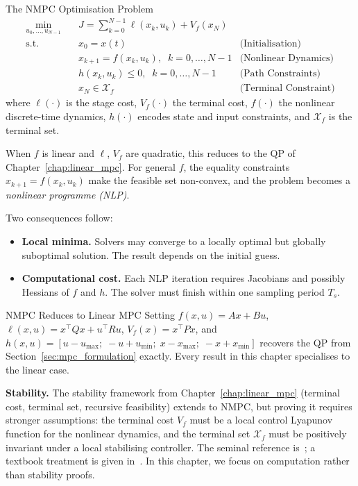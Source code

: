 \begin{defnbox}{The NMPC Optimisation Problem}
	\begin{align*}
		\min_{u_0, \dots, u_{N-1}} \quad & J = \sum_{k=0}^{N-1} \ell(x_k, u_k) + V_f(x_N) \\[4pt]
		\text{s.t.} \quad
		& x_0 = x(t) & \text{(Initialisation)} \\
		& x_{k+1} = f(x_k, u_k), \;\; k = 0, \dots, N{-}1 & \text{(Nonlinear Dynamics)} \\
		& h(x_k, u_k) \le 0, \;\; k = 0, \dots, N{-}1 & \text{(Path Constraints)} \\
		& x_N \in \mathcal{X}_f & \text{(Terminal Constraint)}
	\end{align*}
	where $\ell(\cdot)$ is the stage cost, $V_f(\cdot)$ the terminal cost, $f(\cdot)$ the nonlinear discrete-time dynamics, $h(\cdot)$ encodes state and input constraints, and $\mathcal{X}_f$ is the terminal set.
\end{defnbox}

When $f$ is linear and $\ell$, $V_f$ are quadratic, this reduces to the QP of Chapter~\ref{chap:linear_mpc}. For general $f$, the equality constraints $x_{k+1} = f(x_k, u_k)$ make the feasible set non-convex, and the problem becomes a \emph{nonlinear programme (NLP)}.

Two consequences follow:
\begin{itemize}[nosep]
	\item \textbf{Local minima.} Solvers may converge to a locally optimal but globally suboptimal solution. The result depends on the initial guess.
	\item \textbf{Computational cost.} Each NLP iteration requires Jacobians and possibly Hessians of $f$ and $h$. The solver must finish within one sampling period $T_s$.
\end{itemize}

\begin{notebox}{NMPC Reduces to Linear MPC}
	Setting $f(x,u) = Ax + Bu$, $\ell(x,u) = x^\top Q x + u^\top R u$, $V_f(x) = x^\top P x$, and $h(x,u) = [u - u_{\max};\; -u + u_{\min};\; x - x_{\max};\; -x + x_{\min}]$ recovers the QP from Section~\ref{sec:mpc_formulation} exactly. Every result in this chapter specialises to the linear case.
\end{notebox}

\textbf{Stability.} The stability framework from Chapter~\ref{chap:linear_mpc} (terminal cost, terminal set, recursive feasibility) extends to NMPC, but proving it requires stronger assumptions: the terminal cost $V_f$ must be a local control Lyapunov function for the nonlinear dynamics, and the terminal set $\mathcal{X}_f$ must be positively invariant under a local stabilising controller. The seminal reference is~\cite{Mayne2000}; a textbook treatment is given in~\cite{Grune2017}. In this chapter, we focus on computation rather than stability proofs.

